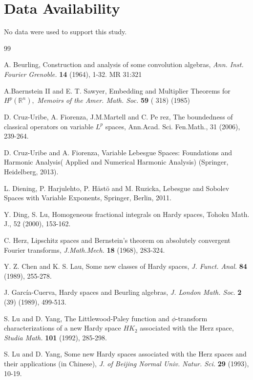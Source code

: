 \documentclass[oneside,reqno]{amsart}
\numberwithin{equation}{section}
\theoremstyle{definition}
\begin{document}
\section*{Data Availability}
	No data were used to support this study.



\begin{thebibliography}{99}

A. Beurling, Construction and analysis of some convolution algebras, \textit{Ann. Inst. Fourier Grenoble.} { \bf 14} (1964), 1-32. MR 31:321

A.Baernstein II and E. T. Sawyer, Embedding and Multiplier Theorems for $H^p(\mathbb{R}^n),$ \textit{Memoirs of the Amer. Math. Soc.}  { \bf 59} ( 318) (1985) 

D. Cruz-Uribe, A. Fiorenza, J.M.Martell and C. Pe rez, The boundedness of classical operators on variable
$L^p$ spaces, Ann.Acad. Sci. Fen.Math., 31 (2006), 239-264.

D. Cruz-Uribe and A. Fiorenza, Variable Lebesgue Spaces: Foundations and Harmonic Analysis(
Applied and Numerical Harmonic Analysis) (Springer, Heidelberg, 2013).


 L. Diening, P. Harjulehto, P. H\"ast\"o and M. Ruzicka, Lebesgue and Sobolev Spaces with Variable Exponents, Springer, Berlin, 2011.

Y. Ding, S. Lu, Homogeneous fractional integrals on Hardy spaces, Tohoku Math. J., 52 (2000), 153-162.

C. Herz, Lipschitz spaces and Bernstein’s theorem on absolutely convergent Fourier transforms, \textit{J.Math.Mech.} {\bf 18}  (1968), 283-324.

Y. Z. Chen and K. S. Lau, Some new classes of Hardy spaces, \textit{J. Funct. Anal.} {\bf 84} (1989), 255-278.

J. Garc\'ia-Cuerva, Hardy spaces and Beurling algebras, \textit{J. London Math. Soc.} {\bf 2} (39) (1989), 499-513. 

S. Lu and D. Yang, The Littlewood-Paley function and $\phi$-transform characterizations of a new Hardy space $HK_2$ associated with the Herz space, \textit{Studia Math.} {\bf 101} (1992), 285-298.  

 S. Lu and D. Yang, Some new Hardy spaces associated with the Herz spaces and their applications (in Chinese), \textit{J. of Beijing Normal Univ. Natur. Sci.} {\bf 29} (1993), 10-19.
 

\end{thebibliography}
\end{document}
